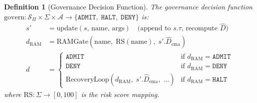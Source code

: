 \documentclass[11pt]{article}
\newtheorem{definition}{Definition}[section]
\newcommand{\Dhat}{\widehat{D}}
\newcommand{\HALT}{\texttt{HALT}}
\newcommand{\DENY}{\texttt{DENY}}
\newcommand{\ADMIT}{\texttt{ADMIT}}
\newcommand{\Proxy}{\Pi}
\newcommand{\ProxyState}{\mathcal{S}_\Proxy}
\begin{document}
\begin{definition}[Governance Decision Function]
\label{def:govern}
The \emph{governance decision function}
$\mathrm{govern}: \ProxyState \times \Sigma \times \mathcal{A}
\to \{\ADMIT,\;\HALT,\;\DENY\}$
is:
\begin{align*}
  s' &= \mathrm{update}(s,\,\text{name},\,\text{args})
         \quad\text{(append to } s.\tau\text{, recompute }\Dhat\text{)}\\
  d_\text{RAM} &= \mathrm{RAMGate}(\text{name},\;\text{RS}(\text{name}),\;s'.\Dhat_\text{ema})\\
  d &=
    \begin{cases}
      \ADMIT  & \text{if } d_\text{RAM} = \ADMIT\\
      \DENY   & \text{if } d_\text{RAM} = \DENY\\
      \mathrm{RecoveryLoop}(d_\text{RAM},\;s'.\Dhat_\text{ema},\;\ldots)
              & \text{if } d_\text{RAM} = \HALT
    \end{cases}
\end{align*}
where $\mathrm{RS}: \Sigma \to [0,100]$ is the risk score mapping.
\end{definition}
\end{document}
